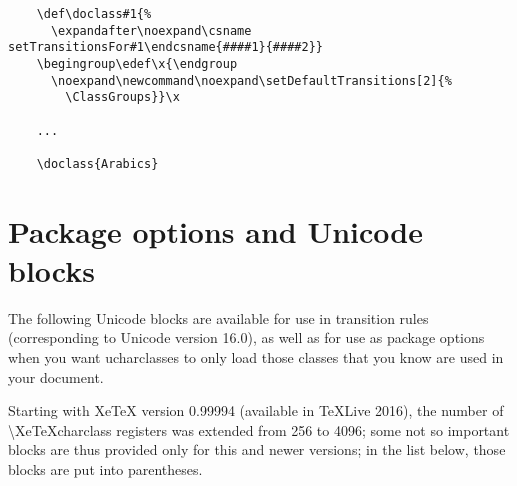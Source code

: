 \documentclass{article}
\begin{document}
    \disableTransitionRules
    \begin{verbatim}
    \def\doclass#1{%
      \expandafter\noexpand\csname setTransitionsFor#1\endcsname{####1}{####2}}
    \begingroup\edef\x{\endgroup
      \noexpand\newcommand\noexpand\setDefaultTransitions[2]{%
        \ClassGroups}}\x

    ...

    \doclass{Arabics}
    \end{verbatim}
    \enableTransitionRules

  \pagebreak

  \section{Package options and Unicode blocks}

    The following Unicode blocks are available for use in transition rules (corresponding to Unicode version 16.0), as well as for use as package options when you want ucharclasses to only load those classes that you know are used in your document.

    Starting with XeTeX version 0.99994 (available in TeXLive 2016), the number of \textbackslash XeTeXcharclass registers was extended from 256 to 4096; some not so important blocks are thus provided only for this and newer versions; in the list below, those blocks are put into parentheses.
\end{document}
